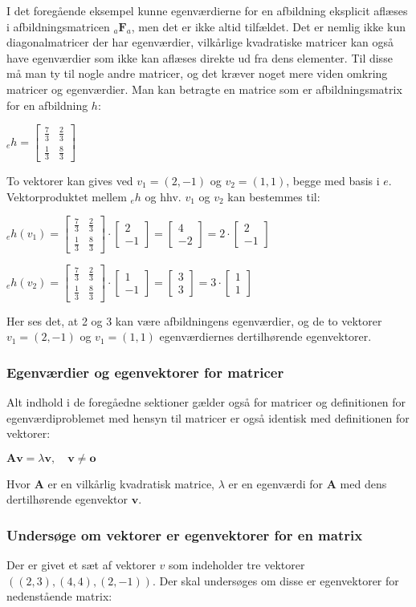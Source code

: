 \documentclass{article}
\newcommand{\cent}[1]{\begin{center}#1\end{center}}
\newcommand{\afb}[3]{\ensuremath{_#1 \textbf{#2}_#3}}
\newcommand{\vekt}[2]{\ensuremath{\begin{bmatrix} #1\\ #2\end{bmatrix}}}
\newcommand{\smallMatrix}[4]{\ensuremath{\begin{bmatrix}
			#1 & #2 \\
			#3 & #4
\end{bmatrix}}}
\begin{document}
	I det foregående eksempel kunne egenværdierne for en afbildning eksplicit aflæses i afbildningsmatricen \afb{a}{F}{a}, men det er ikke altid tilfældet. Det er nemlig ikke kun diagonalmatricer der har egenværdier, vilkårlige kvadratiske matricer kan også have egenværdier som ikke kan aflæses direkte ud fra dens elementer. Til disse må man ty til nogle andre matricer, og det kræver noget mere viden omkring matricer og egenværdier. \newline
	Man kan betragte en matrice som er afbildningsmatrix for en afbildning $h$:
	
	\cent{$ _eh = \smallMatrix{\frac{7}{3}}{\frac{2}{3}}{\frac{1}{3}}{\frac{8}{3}}$}
	
	To vektorer kan gives ved $v_1=(2,-1)$ og $v_2=(1,1)$, begge med basis i $e$. Vektorproduktet mellem $_eh$ og hhv. $v_1$ og $v_2$ kan bestemmes til:
	
	\cent{$ _eh(v_1)= \smallMatrix{\frac{7}{3}}{\frac{2}{3}}{\frac{1}{3}}{\frac{8}{3}} \cdot \vekt{2}{-1} = \vekt{4}{-2} = 2 \cdot \vekt{2}{-1}$}
	\cent{$ _eh(v_2)= \smallMatrix{\frac{7}{3}}{\frac{2}{3}}{\frac{1}{3}}{\frac{8}{3}} \cdot \vekt{1}{-1} = \vekt{3}{3} = 3 \cdot \vekt{1}{1}$}
	
	Her ses det, at 2 og 3 kan være afbildningens egenværdier, og de to vektorer $v_1=(2,-1)$ og $v_1=(1,1)$ egenværdiernes dertilhørende egenvektorer.
	
	\subsubsection{Egenværdier og egenvektorer for matricer}
	Alt indhold i de foregåedne sektioner gælder også for matricer og definitionen for egenværdiproblemet med hensyn til matricer er også identisk med definitionen for vektorer:
	
	\cent{$ \textbf{Av} = \lambda \textbf{v}, \quad \textbf{v} \neq \textbf{o} $}
	
	Hvor $ \textbf{A} $ er en vilkårlig kvadratisk matrice, $ \lambda $ er en egenværdi for $\textbf{A}$ med dens dertilhørende egenvektor $ \textbf{v} $.
	
	\subsubsection{Undersøge om vektorer er egenvektorer for en matrix}
	
	Der er givet et sæt af vektorer $ v $ som indeholder tre vektorer $ ((2,3),(4,4),(2,-1)) $. Der skal undersøges om disse er egenvektorer for nedenstående matrix:
	
\end{document}
